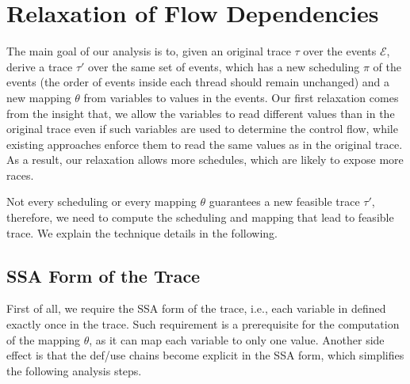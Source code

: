 



\section{Relaxation of Flow Dependencies}
The main goal of our analysis is to, given an original trace $\tau$ over the events $\mathcal{E}$, derive a trace $\tau'$ over the same set of events, which has a new scheduling $\pi$ of the events (the order of events inside each thread should remain unchanged) and a new mapping $\theta$ from variables to values in the events. Our first relaxation comes from the insight that, we allow the variables to read different values than in the original trace even if such variables are used to determine the control flow, while existing approaches enforce them to read the same values as in the original trace. As a result, our relaxation allows more schedules, which are likely to expose more races.
 
Not every scheduling or every mapping $\theta$ guarantees a new feasible trace $\tau'$, therefore, we need to compute the scheduling and mapping that lead to feasible trace. We explain the technique details in the following.





\subsection{SSA Form of the Trace}
First of all, we require the SSA form of the trace, i.e., each variable in defined exactly once in the trace. Such requirement is a prerequisite for the computation of the mapping $\theta$, as it can map each variable to only one value. Another side effect is that the def/use chains become explicit in the SSA form, which simplifies the following analysis steps.

